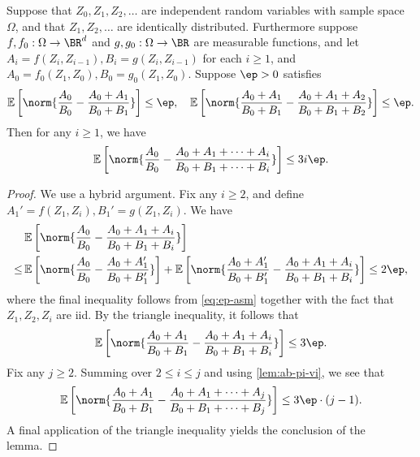 \documentclass{article}
\begin{document}
\begin{lemma}
  \label{lem:hybrid}
  Suppose that $Z_0, Z_1, Z_2, \ldots$ are independent random variables with sample space $\Omega$, and that $Z_1, Z_2, \ldots$ are identically distributed. Furthermore suppose $f, f_0 : \Omega \to \BR^d$ and $g,g_0 : \Omega\to \BR$ are measurable functions, and let $A_i = f(Z_i, Z_{i-1}), B_i = g(Z_i, Z_{i-1})$ for each $i \geq 1$, and $A_0 = f_0(Z_1, Z_0), B_0 = g_0(Z_1, Z_0)$.  Suppose $\ep > 0$ satisfies 
  \begin{align}
\E \left[ \norm{ \frac{A_0}{B_0} - \frac{A_0+A_1}{B_0+B_1} }\right] \leq \ep, \quad \E\left[ \norm{ \frac{A_0+A_1}{B_0+B_1} - \frac{A_0 + A_1 + A_2}{B_0 + B_1 + B_2} } \right] \leq \ep\label{eq:ep-asm}.
  \end{align}
  Then for any $i \geq 1$, we have
  \begin{align}
\E \left[ \norm{ \frac{A_0}{B_0} - \frac{A_0 + A_1 + \cdots + A_i}{B_0 + B_1 + \cdots + B_i} } \right] \leq 3i\ep\nonumber.
  \end{align}
\end{lemma}
\begin{proof}
  We use a hybrid argument. Fix any $i \geq 2$, and define $A_1' = f(Z_1, Z_i), B_1' = g(Z_1, Z_i)$. We have
  \begin{align}
    & \E\left[ \norm{ \frac{A_0}{B_0} - \frac{A_0 + A_1 + A_i}{B_0 + B_1 + B_i} } \right] \nonumber\\
    \leq & \E\left[ \norm{ \frac{A_0}{B_0} - \frac{A_0 + A_1'}{B_0 + B_1'} } \right] + \E\left[ \norm{ \frac{A_0+A_1'}{B_0+B_1'} - \frac{A_0 + A_1 + A_i}{B_0 + B_1 + B_i} } \right]\leq 2\ep\nonumber,
  \end{align}
  where the final inequality follows from \cref{eq:ep-asm} together with the fact that $Z_1, Z_2, Z_i$ are iid. By the triangle inequality, it follows that
  \begin{align}
 \E\left[ \norm{ \frac{A_0+A_1}{B_0+B_1} - \frac{A_0 + A_1 + A_i}{B_0 + B_1 + B_i} } \right]  \leq 3\ep\nonumber. 
  \end{align}
  Fix any $j \geq 2$. Summing over $2 \leq i \leq j$ and using \cref{lem:ab-pi-vi}, we see that
  \begin{align}
\E\left[ \norm{ \frac{A_0+A_1}{B_0 + B_1} - \frac{A_0 + A_1 + \cdots + A_j}{B_0 + B_1 + \cdots + B_j} } \right] \leq 3\ep \cdot (j-1)\nonumber.
  \end{align}
  A final application of the triangle inequality yields the conclusion of the lemma. 
\end{proof}
\end{document}
